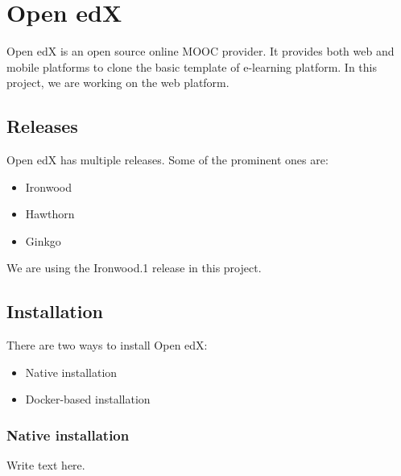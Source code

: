 \documentclass[12pt]{article}
\begin{document}
\section{Open edX}
Open edX is an open source online MOOC provider. It provides both web and mobile platforms to clone the basic template of e-learning platform. In this project, we are working on the web platform.

\subsection{Releases}
Open edX has multiple releases. Some of the prominent ones are:
\begin{itemize}
	\item Ironwood
	\item Hawthorn
	\item Ginkgo
\end{itemize}
We are using the Ironwood.1 release in this project.

\subsection{Installation}
There are two ways to install Open edX:
\begin{itemize}
	\item Native installation
	\item Docker-based installation
\end{itemize}
\subsubsection{Native installation}
Write text here.  
\end{document}
